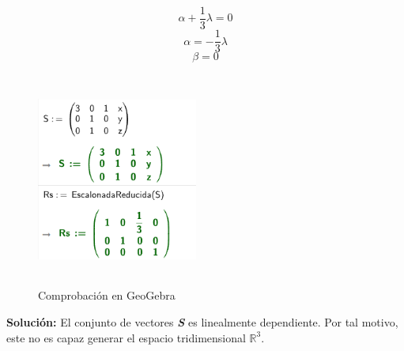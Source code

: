 \[
    \alpha+\frac{1}{3}\lambda=0
\]
\[
    \alpha=-\frac{1}{3}\lambda
\]
\[
    \beta=0
\]
\begin{figure}[ht!]
    \centering
    \includegraphics[width=150pt,height=200pt]{img/imagen10.png}
    \caption{Comprobación en GeoGebra}
\end{figure}
\begin{center}
    \textbf{Solución: }El conjunto de vectores \textbf{\textit{S}} es linealmente dependiente. Por tal motivo, este no es capaz generar el espacio tridimensional $\mathbb{R}^3$.
\end{center}

